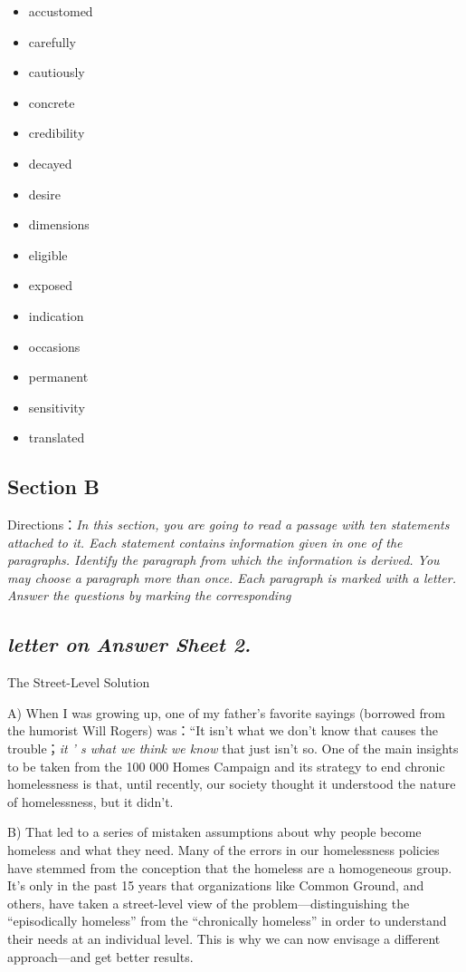 \documentclass[UTF8,11pt]{ctexart}
\begin{document}
\begin{itemize}[leftmargin=2em,itemsep=.2em,topsep=.4em]\item[A.] accustomed
\item[B.] carefully
\item[C.] cautiously
\item[D.] concrete
\item[E.] credibility
\item[F.] decayed
\item[G.] desire
\item[H.] dimensions
\item[I.] eligible
\item[J.] exposed
\item[K.] indication
\item[L.] occasions
\item[M.] permanent
\item[N.] sensitivity
\item[O.] translated
\end{itemize}

\subsection*{\textbf{Section B}}


Directions：\textit{In this section, you are going to read a passage with ten statements attached to it. Each statement contains} \textit{information given in one of the paragraphs. Identify the paragraph from which the information is derived. You may choose a} \textit{paragraph more than once. Each paragraph is marked with a letter. Answer the questions by marking the corresponding}


\subsection*{\textit{letter on}\textbf{\textit{ Answer Sheet 2.}}}


The Street-Level Solution


A) When I was growing up, one of my father’s favorite sayings (borrowed from the humorist Will Rogers) was：“It isn’t what we don’t know that causes the trouble；\textit{it ’ s what we think we know} that just isn’t so. One of the main insights to be taken from the 100 000 Homes Campaign and its strategy to end chronic homelessness is that, until recently, our society thought it understood the nature of homelessness, but it didn’t.


B) That led to a series of mistaken assumptions about why people become homeless and what they need. Many of the errors in our homelessness policies have stemmed from the conception that the homeless are a homogeneous group. It’s only in the past 15 years that organizations like Common Ground, and others, have taken a street-level view of the problem—distinguishing the “episodically homeless” from the “chronically homeless” in order to understand their needs at an individual level. This is why we can now envisage a different approach—and get better results.
\end{document}
